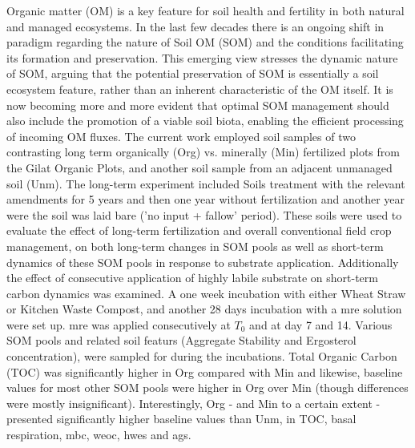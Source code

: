 	Organic matter (OM) is a key feature for soil health and fertility in both natural and managed ecosystems. In the last few decades there is an ongoing shift in paradigm regarding the nature of Soil OM (SOM) and the conditions facilitating its formation and preservation. This emerging view stresses the dynamic nature of SOM, arguing that the potential preservation of SOM is essentially a soil ecosystem feature, rather than an inherent characteristic of the OM itself. It is now becoming more and more evident that optimal SOM management should also include the promotion of a viable soil biota, enabling the efficient processing of incoming OM fluxes. The current work employed soil samples of two contrasting long term organically (Org) vs. minerally (Min) fertilized plots from  the Gilat Organic Plots, and another soil sample from an adjacent unmanaged soil (Unm). The long-term experiment included Soils treatment with the relevant amendments for 5 years and then one year without fertilization and another year were the soil was laid bare ('no input + fallow' period). These soils were used to evaluate the effect of long-term fertilization and overall conventional field crop management, on both long-term changes in SOM pools as well as short-term dynamics of these SOM pools in response to substrate application. Additionally the effect of consecutive application of highly labile substrate on short-term carbon dynamics was examined. 
	A one week incubation with either Wheat Straw or Kitchen Waste Compost, and another 28 days incubation with a \gls{mre} solution were set up. \gls{mre} was applied consecutively at $ T_0 $ and at day 7 and 14. Various SOM pools and related soil featurs (Aggregate Stability and Ergosterol concentration), were sampled for during the incubations.  
	Total Organic Carbon (TOC) was significantly higher in Org compared with Min and likewise, baseline values  for most other SOM pools were higher in Org over Min (though differences were mostly insignificant). Interestingly, Org - and Min to a certain extent - presented significantly higher baseline values than Unm, in TOC, basal respiration, \gls{mbc}, \gls{weoc}, \gls{hwes} and \gls{ags}. 
